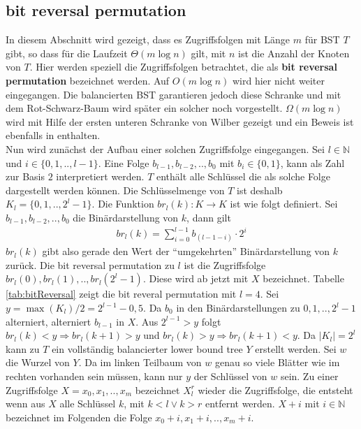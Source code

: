 \documentclass[a4paper,12pt]{article}
\begin{document}
\subsection{bit reversal permutation } \label{abschnittBitReversal}
In diesem Abschnitt wird gezeigt, dass es Zugriffsfolgen mit Länge $m$ für BST $T$ gibt, so dass für die Laufzeit  $\Theta\left(m \log n\right)$ gilt, mit $n$ ist die Anzahl der Knoten von $T$. Hier werden speziell die Zugriffsfolgen betrachtet, die als \textbf{bit reversal permutation} bezeichnet werden. Auf $O\left(m \log n\right)$ wird hier nicht weiter eingegangen. Die balancierten BST garantieren jedoch diese Schranke und mit dem Rot-Schwarz-Baum wird später ein solcher noch vorgestellt.
$\Omega\left(m \log n\right)$  wird mit Hilfe der ersten unteren Schranke von Wilber gezeigt und ein Beweis ist ebenfalls in \cite{wilberLowerBounds} enthalten. \\
Nun wird zunächst der Aufbau einer solchen Zugriffsfolge eingegangen. Sei $l \in \mathbb{N}$ und $i \in \{0,1,..,l-1\}$. Eine Folge  $b_{l-1},b_{l-2},..,b_0$ mit $b_i \in \{0,1\}$, kann als Zahl zur Basis $2$ interpretiert werden. $T$ enthält alle Schlüssel die als solche Folge dargestellt werden können. Die Schlüsselmenge von $T$ ist deshalb $K_l = \{0,1,..,2^l -1\}$. 
Die Funktion $\mathit{br}_l(k)\colon K \rightarrow K$ ist wie folgt definiert. Sei {$b_{l-1},b_{l-2},..,b_{0}$} die Binärdarstellung von $k$, dann gilt 
\begin{align*}
\mathit{br}_l(k) = \sum_{i = 0}^{l-1} b_{\left(l-1-i\right)} \cdot 2^i
\end{align*}
$\mathit{br}_l(k)$ gibt also gerade den Wert der \enquote{umgekehrten} Binärdarstellung von $k$ zurück. Die bit reversal permutation zu $l$ ist die Zugriffsfolge\\ ${\mathit{br}_l(0),\mathit{br}_l(1),..,\mathit{br}_l(2^l-1)}$. Diese wird ab jetzt mit $X$ bezeichnet. Tabelle \ref{tab:bitReversal} zeigt die bit reveral permutation mit $l  = 4$. Sei $y = \max\left(K_l\right) /2 = 2^{l-1} - 0,5 $. Da $b_0$ in den Binärdarstellungen zu $0, 1,.., 2^l-1$ alterniert, alterniert $b_{l-1}$ in $X$. Aus $2^{l-1} > y$ folgt $\mathit{br}_l(k) < y \Rightarrow \mathit{br}_l(k +1) > y$ und $\mathit{br}_l(k) > y \Rightarrow \mathit{br}_l(k +1) < y$. Da $\vert K_l \vert = 2^l$ kann zu $T$ ein vollständig balancierter lower bound tree $Y$ erstellt werden. Sei $w$ die Wurzel von $Y$. Da im linken Teilbaum von $w$ genau so viele Blätter wie im rechten vorhanden sein müssen, kann nur $y$ der Schlüssel von $w$ sein. Zu einer Zugriffsfolge $X = x_0,x_1,..,x_m$ bezeichnet $X^r_l$ wieder die Zugriffsfolge, die entsteht wenn aus $X$ alle Schlüssel $k$, mit $k < l \lor k > r$ entfernt werden. $X + i$ mit $i \in \mathbb{N}$ bezeichnet im Folgenden die Folge $x_0 + i, x_1 + i,.., x_m + i$.\\
\end{document}
